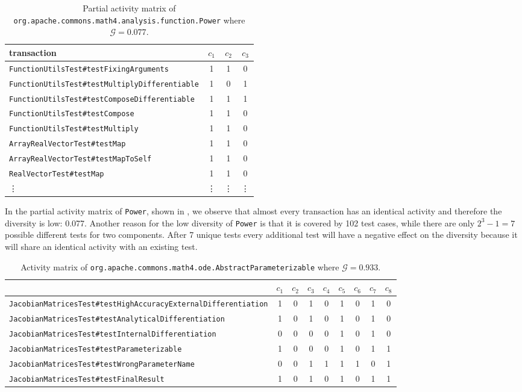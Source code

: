 \documentclass[twoside,a4paper,11pt]{memoir}
\begin{document}
\begin{table}[]
\scriptsize
\centering
\caption{Partial activity matrix of \texttt{org.apache.commons.math4.analysis.function.Power} where \(\mathcal{G} = 0.077\).}%
\label{tab:power}
\begin{tabular}{l|ccc}
transaction & \(c_1 \) & \(c_2 \) & \(c_3 \) \\ \hline
\texttt{FunctionUtilsTest\#testFixingArguments} & 1 & 1 & 0 \\
\texttt{FunctionUtilsTest\#testMultiplyDifferentiable} & 1 & 0 & 1 \\
\texttt{FunctionUtilsTest\#testComposeDifferentiable} & 1 & 1 & 1 \\
\texttt{FunctionUtilsTest\#testCompose} & 1 & 1 & 0 \\
\texttt{FunctionUtilsTest\#testMultiply} & 1 & 1 & 0 \\
\texttt{ArrayRealVectorTest\#testMap} & 1 & 1 & 0 \\
\texttt{ArrayRealVectorTest\#testMapToSelf} & 1 & 1 & 0 \\
\texttt{RealVectorTest\#testMap} & 1 & 1 & 0 \\
\vdots & \vdots & \vdots & \vdots
\end{tabular}
\end{table}

In the partial activity matrix of \texttt{Power}, shown in , we observe that almost every transaction has an identical activity and therefore the diversity is low: 0.077.
Another reason for the low diversity of \texttt{Power} is that it is covered by 102 test cases, while there are only \(2^3 - 1 = 7 \) possible different tests for two components.
After 7 unique tests every additional test will have a negative effect on the diversity because it will share an identical activity with an existing test.

\begin{table}[]
\scriptsize
\centering
\caption{Activity matrix of \texttt{org.\-apache.\-commons.\-math4.\-ode.\-AbstractParameterizable} where \(\mathcal{G} = 0.933\).}%
\label{tab:abstractparameter}
\begin{adjustbox}{center}
\begin{tabular}{l|cccccccc}
 & \(c_1 \) & \(c_2 \) & \(c_3 \) & \(c_4 \) & \(c_5 \) & \(c_6 \) & \(c_7 \) & \(c_8 \) \\ \hline
\texttt{JacobianMatricesTest\#testHighAccuracyExternalDifferentiation} & 1 & 0 & 1 & 0 & 1 & 0 & 1 & 0 \\
\texttt{JacobianMatricesTest\#testAnalyticalDifferentiation} & 1 & 0 & 1 & 0 & 1 & 0 & 1 & 0 \\
\texttt{JacobianMatricesTest\#testInternalDifferentiation} & 0 & 0 & 0 & 0 & 1 & 0 & 1 & 0 \\
\texttt{JacobianMatricesTest\#testParameterizable} & 1 & 0 & 0 & 0 & 1 & 0 & 1 & 1 \\
\texttt{JacobianMatricesTest\#testWrongParameterName} & 0 & 0 & 1 & 1 & 1 & 1 & 0 & 1 \\
\texttt{JacobianMatricesTest\#testFinalResult} & 1 & 0 & 1 & 0 & 1 & 0 & 1 & 1
\end{tabular}
\end{adjustbox}
\end{table}
\end{document}
